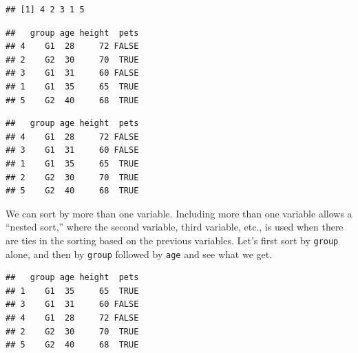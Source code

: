 \documentclass[
]{book}
\newenvironment{Shaded}{\begin{snugshade}}{\end{snugshade}}
\newcommand{\CommentTok}[1]{\textcolor[rgb]{0.56,0.35,0.01}{\textit{#1}}}
\newcommand{\KeywordTok}[1]{\textcolor[rgb]{0.13,0.29,0.53}{\textbf{#1}}}
\newcommand{\NormalTok}[1]{#1}
\newcommand{\OperatorTok}[1]{\textcolor[rgb]{0.81,0.36,0.00}{\textbf{#1}}}
\begin{document}
\begin{verbatim}
## [1] 4 2 3 1 5
\end{verbatim}

\begin{Shaded}
\end{Shaded}

\begin{verbatim}
##   group age height  pets
## 4    G1  28     72 FALSE
## 2    G2  30     70  TRUE
## 3    G1  31     60 FALSE
## 1    G1  35     65  TRUE
## 5    G2  40     68  TRUE
\end{verbatim}

\begin{Shaded}
\end{Shaded}

\begin{verbatim}
##   group age height  pets
## 4    G1  28     72 FALSE
## 3    G1  31     60 FALSE
## 1    G1  35     65  TRUE
## 2    G2  30     70  TRUE
## 5    G2  40     68  TRUE
\end{verbatim}

We can sort by more than one variable. Including more than one variable allows a ``nested sort,'' where the second variable, third variable, etc., is used when there are ties in the sorting based on the previous variables. Let's first sort by \texttt{group} alone, and then by \texttt{group} followed by \texttt{age} and see what we get.

\begin{Shaded}
\end{Shaded}

\begin{verbatim}
##   group age height  pets
## 1    G1  35     65  TRUE
## 3    G1  31     60 FALSE
## 4    G1  28     72 FALSE
## 2    G2  30     70  TRUE
## 5    G2  40     68  TRUE
\end{verbatim}
\end{document}
